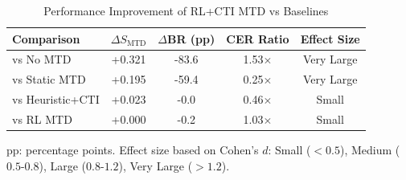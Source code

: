 \begin{table}[!t]
\centering
\caption{Performance Improvement of RL+CTI MTD vs Baselines}
\label{tab:improvement}
\renewcommand{\arraystretch}{1.1}
\begin{tabular}{@{}lcccc@{}}
\toprule
\textbf{Comparison} & $\Delta S_{\mathrm{MTD}}$ & $\Delta$\textbf{BR (pp)} & \textbf{CER Ratio} & \textbf{Effect Size} \\
\midrule
vs No MTD & +0.321 & -83.6 & 1.53$\times$ & Very Large \\
vs Static MTD & +0.195 & -59.4 & 0.25$\times$ & Very Large \\
vs Heuristic+CTI & +0.023 & -0.0 & 0.46$\times$ & Small \\
vs RL MTD & +0.000 & -0.2 & 1.03$\times$ & Small \\
\bottomrule
\end{tabular}
\vspace{1mm}
\footnotesize{pp: percentage points. Effect size based on Cohen's $d$: Small ($<0.5$), Medium ($0.5$-$0.8$), Large ($0.8$-$1.2$), Very Large ($>1.2$).}
\end{table}
